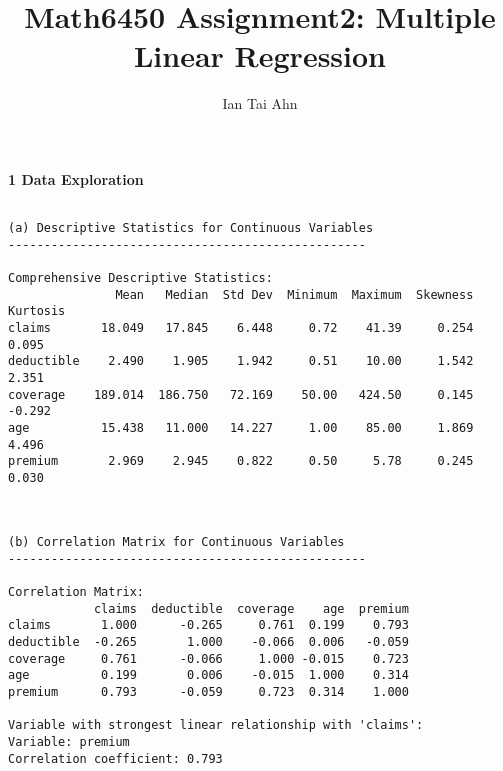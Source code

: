 \documentclass[8pt, twocolumn]{extarticle}
\title{Math6450 Assignment2: Multiple Linear Regression}
\author{Ian Tai Ahn}
\begin{document}
\fontsize{6.5pt}{8pt}\selectfont
    \maketitle
    \textbf{1 Data Exploration}
    \begin{Verbatim}[commandchars=\\\{\}]

(a) Descriptive Statistics for Continuous Variables
--------------------------------------------------

Comprehensive Descriptive Statistics:
               Mean   Median  Std Dev  Minimum  Maximum  Skewness  Kurtosis
claims       18.049   17.845    6.448     0.72    41.39     0.254     0.095
deductible    2.490    1.905    1.942     0.51    10.00     1.542     2.351
coverage    189.014  186.750   72.169    50.00   424.50     0.145    -0.292
age          15.438   11.000   14.227     1.00    85.00     1.869     4.496
premium       2.969    2.945    0.822     0.50     5.78     0.245     0.030
    \end{Verbatim}

    \begin{Verbatim}[commandchars=\\\{\}]


(b) Correlation Matrix for Continuous Variables
--------------------------------------------------

Correlation Matrix:
            claims  deductible  coverage    age  premium
claims       1.000      -0.265     0.761  0.199    0.793
deductible  -0.265       1.000    -0.066  0.006   -0.059
coverage     0.761      -0.066     1.000 -0.015    0.723
age          0.199       0.006    -0.015  1.000    0.314
premium      0.793      -0.059     0.723  0.314    1.000

Variable with strongest linear relationship with 'claims':
Variable: premium
Correlation coefficient: 0.793
    \end{Verbatim}

    \begin{center}
    \end{center}
    { \hspace*{\fill} \\}
    
\end{document}
